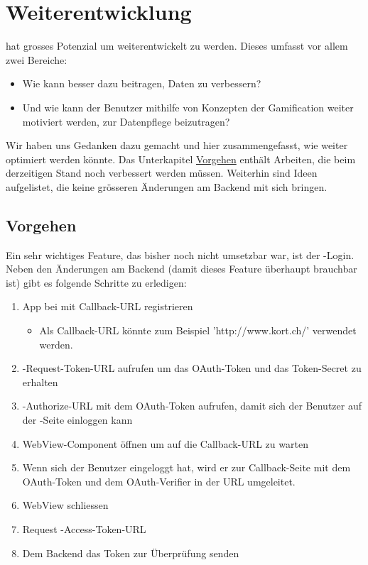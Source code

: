 \chapter{Weiterentwicklung}
\label{pd-weiterentwicklung}

\kort{} hat grosses Potenzial um weiterentwickelt zu werden.
Dieses umfasst vor allem zwei Bereiche:

\begin{itemize}
	\item Wie kann \kort{} besser dazu beitragen,  Daten zu verbessern?
	\item Und wie kann der Benutzer mithilfe von Konzepten der Gamification weiter motiviert werden, zur Datenpflege beizutragen?
\end{itemize}

Wir haben uns Gedanken dazu gemacht und hier zusammengefasst, wie \kort{} weiter optimiert werden könnte.
Das Unterkapitel \hyperref[pd-weiterentwicklung-vorgehen]{Vorgehen} enthält Arbeiten, die beim derzeitigen Stand noch verbessert werden müssen. 
Weiterhin sind Ideen aufgelistet, die keine grösseren Änderungen am Backend mit sich bringen.

\section{Vorgehen}
\label{pd-weiterentwicklung-vorgehen}
Ein sehr wichtiges Feature, das bisher noch nicht umsetzbar war, ist der -Login.
Neben den Änderungen am Backend (damit dieses Feature überhaupt brauchbar ist) gibt es folgende Schritte zu erledigen:

\begin{enumerate}
	\item App bei  mit Callback-URL registrieren
	\begin{itemize}
		\item Als Callback-URL könnte zum Beispiel 'http://www.kort.ch/' verwendet werden.
	\end{itemize}
	\item {}-Request-Token-URL aufrufen um das OAuth-Token und das Token-Secret zu erhalten
	\item {}-Authorize-URL mit dem OAuth-Token aufrufen, damit sich der Benutzer auf der -Seite einloggen kann
	\item WebView-Component öffnen um auf die Callback-URL zu warten 
	\item Wenn sich der Benutzer eingeloggt hat, wird er zur Callback-Seite mit dem OAuth-Token und dem OAuth-Verifier in der URL umgeleitet.
	\item WebView schliessen
	\item Request -Access-Token-URL
	\item Dem Backend das Token zur Überprüfung senden
\end{enumerate}

